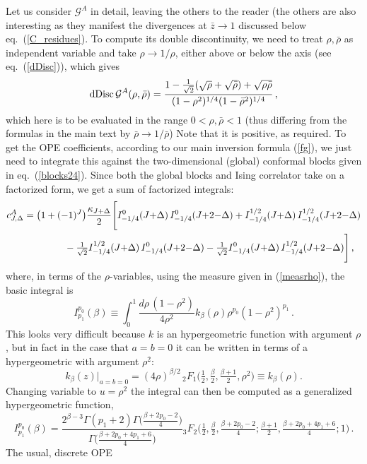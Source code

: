 \documentclass[11pt, reqno,preprint]{article}
\def\be{\begin{equation}}
\def\ee{\end{equation}}
\def\dDisc{{\rm dDisc}\,}
\def\rhobar{\bar{\rho}}
\def\zbar{\bar{z}}
\def\j{J}
\def\GG{\mathcal{G}}
\begin{document}
\begin{appendix}
Let us consider $\GG^A$ in detail, leaving the others to the reader (the others are also interesting as they manifest the divergences at $\zbar\to 1$ discussed below eq.~(\ref{C_residues}).
To compute its double discontinuity, we need to treat $\rho,\rhobar$ as independent variable and take $\rho\to 1/\rho$, either above or below the axis (see eq.~(\ref{dDisc})), which gives
\be
 \dDisc \GG^A(\rho,\rhobar) = \frac{1-\tfrac{1}{\sqrt{2}}(\sqrt{\rho}+\sqrt{\rhobar})+\sqrt{\rho\rhobar}}{(1-\rho^2)^{1/4}(1-\rhobar^2)^{1/4}}\,,
\ee
which here is to be evaluated in the range $0<\rho,\rhobar<1$
(thus differing from the formulas in the main text by $\rhobar\to1/\rhobar$)
Note that it is positive, as required.
To get the OPE coefficients, according to our main inversion formula (\ref{fg}),
we just need to integrate this against the two-dimensional (global) conformal blocks given in eq.~(\ref{blocks24}).
Since both the global blocks and Ising correlator take on a factorized form, we get a sum of factorized integrals:
\def\II#1#2#3{{I^{#1}_{#2}(#3)}}
\be\begin{aligned}\label{cA}
 c^A_{\j,\Delta} &= \big(1+(-1)^\j\big)\frac{\kappa_{\j+\Delta}}{2}\Bigg[\II{0}{-1/4}{\j{+}\Delta}\,\II{0}{-1/4}{\j{+}2{-}\Delta}+
 \II{1/2}{-1/4}{\j{+}\Delta}\,\II{1/2}{-1/4}{\j{+}2{-}\Delta}
\\&\hspace{15mm} -\tfrac{1}{\sqrt{2}}\II{1/2}{-1/4}{\j{+}\Delta}\,\II{0}{-1/4}{\j{+}2{-}\Delta}
-\tfrac{1}{\sqrt{2}}\II{0}{-1/4}{\j{+}\Delta}\,\II{1/2}{-1/4}{\j{+}2{-}\Delta}\Bigg]\,,
\end{aligned}\ee
where, in terms of the $\rho$-variables, using the measure given in (\ref{measrho}), the basic integral is
\be
\II{p_0}{p_1}{\beta} \equiv \int_0^1 \frac{d\rho\,(1-\rho^2)}{4\rho^2} k_\beta(\rho)
\rho^{p_0}(1-\rho^2)^{p_1}\,.
\ee
This looks very difficult because $k$ is an hypergeometric function with argument $\rho$, but in fact in the case that $a=b=0$
it can be written in terms of a hypergeometric with argument $\rho^2$:
\be
k_\beta(z)\big|_{a=b=0} = (4\rho)^{\beta/2}\,{}_2F_1\big(\tfrac12,\tfrac{\beta}{2},\tfrac{\beta+1}{2},\rho^2\big)\equiv k_\beta(\rho).
\ee
Changing variable to $u=\rho^2$ the integral can then be computed as a generalized hypergeometric function,
\be
\II{p_0}{p_1}{\beta} =
\frac{2^{\beta-3}\Gamma(p_1+2)\Gamma\big(\tfrac{\beta+2p_0-2}{4}\big)}{\Gamma\big(\tfrac{\beta+2p_0+4p_1+6}{4}\big)}
{}_3F_2\big(\tfrac12,\tfrac{\beta}{2},\tfrac{\beta+2p_0-2}{4}; \tfrac{\beta+1}{2},\tfrac{\beta+2p_0+4p_1+6}{4}; 1\big)\,.
\ee
The usual, discrete OPE

\end{appendix}
\end{document}

